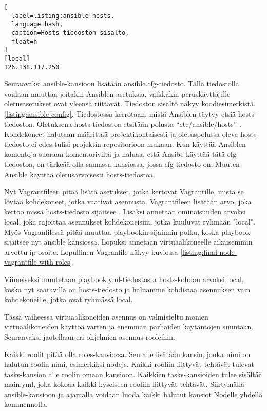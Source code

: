 \begin{lstlisting}[
  label=listing:ansible-hosts,
  language=bash,
  caption=Hosts-tiedoston sisältö,
  float=h
]
[local]
126.138.117.250
\end{lstlisting}

Seuraavaksi ansible-kansioon lisätään ansible.cfg-tiedosto. Tällä tiedostolla voidaan muuttaa joitakin Ansiblen asetuksia, vaikkakin peruskäyttäjille oletusasetukset ovat yleensä riittävät. Tiedoston sisältö näkyy koodiesimerkistä \ref{listing:ansible-config}. Tiedostossa kerrotaan, mistä Ansiblen täytyy etsiä hosts-tiedostoa. Oletuksena hosts-tiedostoa etsitään polusta \enquote{etc/ansible/hosts} \cite{link:ansible-inventory}. Kohdekoneet halutaan määrittää projektikohtaisesti ja oletuspolussa oleva hosts-tiedosto ei edes tulisi projektin repositorioon mukaan. Kun käyttää Ansiblen komentoja suoraan komentoriviltä ja haluaa, että Ansibe käyttää tätä cfg-tiedostoa, on tärkeää olla samassa kansiossa, jossa cfg-tiedosto on. Muuten Ansible käyttää oletusarvoisesti hosts-tiedostoa.

Nyt Vagrantfileen pitää lisätä asetukset, jotka kertovat Vagrantille, mistä se löytää kohdekoneet, jotka vaativat asennusta. Vagrantfileen lisätään  arvo, joka kertoo missä hosts-tiedosto sijaitsee \cite{link:vagrant-ansible-settings}. Lisäksi annetaan  ominaisuuden arvoksi local, joka rajoittaa asennukset kohdekoneisiin, jotka kuuluvat ryhmään "local". Myös Vagranfilessä pitää muuttaa playbookin sijainnin polku, koska playbook sijaitsee nyt ansible kansiossa. Lopuksi annetaan virtuaalikoneelle aikaisemmin arvottu ip-osoite. Lopullinen Vagranfile näkyy kuviossa \ref{listing:final-node-vagrantfile-with-roles}.

Viimeiseksi muutetaan playbook.yml-tiedostosta hosts-kohdan arvoksi local, koska nyt saatavilla on hosts-tiedosto ja haluamme kohdistaa asennuksen vain kohdekoneille, jotka ovat ryhmässä local.

Tässä vaiheessa virtuaalikoneiden asennus on valmisteltu monien virtuaalikoneiden käyttöä varten ja enemmän parhaiden käytäntöjen suuntaan. Seuraavaksi jaotellaan eri ohjelmien asennus rooleihin.

Kaikki roolit pitää olla roles-kansiossa. Sen alle lisätään kansio, jonka nimi on halutun roolin nimi, esimerkiksi nodejs. Kaikki rooliin liittyvät tehtävät tulevat tasks-kansion alle roolin omaan kansioon. Kaikkien tasks-kansioiden tulee sisältää main.yml, joka kokoaa kaikki kyseiseen rooliin liittyvät tehtävät. Siirtymällä ansible-kansioon ja ajamalla  voidaan luoda kaikki halutut kansiot Nodelle yhdellä kommennolla.


